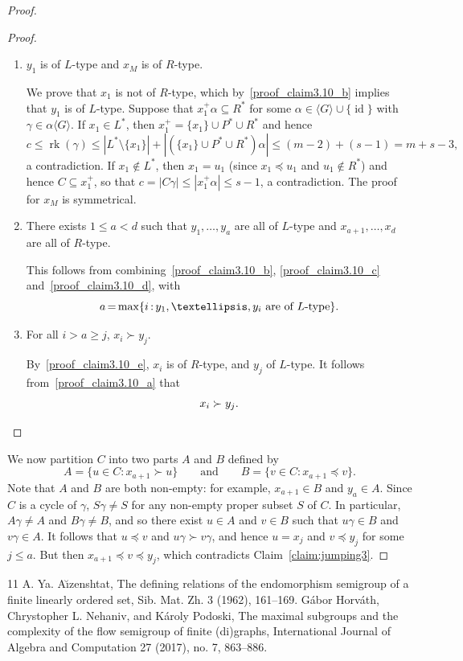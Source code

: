 \documentclass[10pt]{amsart}
\DeclareMathOperator{\rk}{rk}
\DeclareMathOperator{\id}{id}
\newcommand{\genset}[1]{\langle#1\rangle}
\newcommand{\set}[2]{\{#1:#2\}}
\newcommand*{\Mk}{\mkern -2mu}
\begin{document}
\begin{proof}
\begin{proof}
\begin{enumerate}[label=(\alph*)]
\item\label{proof_claim3.10_d}
$y_1$ is of $L$-type and $x_M$ is of $R$-type.

 We prove that $x_1$ is not of $R$-type, which by~\ref{proof_claim3.10_b} implies that $y_1$ is of $L$-type. Suppose that $x_1^+ \alpha \subseteq R^*$ for some
 $\alpha\in\genset{G}\cup\{\id\}$ with $\gamma\in\alpha\genset{G}$. If $x_1 \in
 L^*$, then $x_1^+ = \{x_1\} \cup P^* \cup R^*$ and hence 
 \[ 
 c \le \rk(\gamma)
 \le |L^* \setminus \{x_1\}| + |(\{x_1\} \cup P^* \cup R^*)\alpha| \le (m-2) +
 (s-1) = m + s - 3 ,
 \]
  a contradiction. If $x_1 \notin L^*$, then $x_1 = u_1$
 (since $x_1 \preceq u_1$ and $u_1 \not\in R^*$) and hence $C \subseteq x_1^+$, so
 that $c=|C\gamma| \le |x_1^+ \alpha| \le s-1$, a contradiction. The proof for $x_M$ is
 symmetrical.

 \item\label{proof_claim3.10_e} 
 There exists $1 \le a < d$ such that $y_1, \dots, y_a$ are all of
 $L$-type and $x_{a+1}, \dots, x_d$ are all of $R$-type.

 This follows from combining~\ref{proof_claim3.10_b}, \ref{proof_claim3.10_c} and~\ref{proof_claim3.10_d}, with 
 \[
 a\Mk =\Mk \max\set{i\Mk }{\Mk y_1,\ldots,y_i \text{ are of $L$-type}}.
 \]

 \item\label{proof_claim3.10_f}  
 For all $i > a \ge j$, $x_i \succ y_j$.

 By~\ref{proof_claim3.10_e}, $x_i$ is of $R$-type, and $y_j$ of $L$-type. It follows from~\ref{proof_claim3.10_a} that 
 \[
 x_i \succ y_j.\qedhere
\]
\end{enumerate}
\end{proof}

We now partition $C$ into two parts $A$ and $B$ defined by
\[A = \{ u \in C : x_{a+1} \succ u \} \qquad\text{and}\qquad
B = \{ v \in C : x_{a+1} \preceq v \}.\]
Note that $A$ and $B$ are both non-empty: for example, $x_{a+1}\in B$ and $y_a\in A$.
Since $C$ is a cycle of $\gamma$, $S \gamma \ne S$ for any non-empty proper 
subset $S$ of $C$. In particular, $A \gamma \ne A$ and $B \gamma \ne B$, and so 
there exist $u\in A$ and $v\in B$ such that $u \gamma \in B$ and $v \gamma \in A$.
It follows that $u\preceq v$ and $u\gamma \succ v\gamma$, and hence
$u = x_j$ and $v \preceq y_j$ for some $j \le
a$. But then $x_{a+1}\preceq v\preceq y_j$, which
contradicts Claim~\ref{claim:jumping3}.
\end{proof}
\begin{thebibliography}{11}
 A. Ya. A\u{\i}zenshtat, The defining relations of the endomorphism semigroup of a finite linearly ordered set, Sib. Mat. Zh. 3 (1962), 161--169.
 Gábor Horváth, Chrystopher L. Nehaniv, and Károly Podoski, The maximal subgroups and the complexity of the flow semigroup of finite (di)graphs, International Journal of Algebra and Computation 27 (2017), no. 7, 863--886.
\end{thebibliography}
\end{document}
